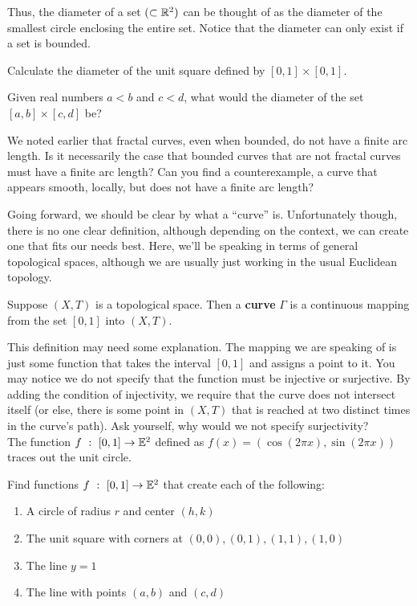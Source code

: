 Thus, the diameter of a set $(\subset \mathbb{R}^2)$ can be thought of as the diameter of the smallest circle enclosing the entire set. Notice that the diameter can only exist if a set is bounded. 
\begin{exercise}
    Calculate the diameter of the unit square defined by $[0,1]\times[0,1]$.
\end{exercise}
\begin{exercise}
    Given real numbers $a<b$ and $c<d$, what would the diameter of the set $[a,b]\times [c,d]$ be?
\end{exercise}
\begin{exercise} 
    We noted earlier that fractal curves, even when bounded, do not have a finite arc length. Is it necessarily the case that bounded curves that are not fractal curves must have a finite arc length? Can you find a counterexample, a curve that appears smooth, locally, but does not have a finite arc length? 
\end{exercise}

Going forward, we should be clear by what a ``curve'' is. Unfortunately though, there is no one clear definition, although depending on the context, we can create one that fits our needs best. Here, we'll be speaking in terms of general topological spaces, although we are usually just working in the usual Euclidean topology. \\

\begin{definition}[Curve]
    Suppose $(X,T)$ is a topological space. Then a \textbf{curve} $\Gamma$ is a continuous mapping from the set $[0,1]$ into $(X,T)$.
\end{definition}

This definition may need some explanation. The mapping we are speaking of is just some function that takes the interval $[0,1]$ and assigns a point to it. You may notice we do not specify that the function must be injective or surjective. By adding the condition of injectivity, we require that the curve does not intersect itself (or else, there is some point in $(X,T)$ that is reached at two distinct times in the curve's path). Ask yourself, why would we not specify surjectivity?\\

The function $f\ :\ [0,1]\to\mathbb{E}^2$ defined as $f(x)=\left(\cos(2\pi x),\sin(2\pi x)\right)$ traces out the unit circle.\\

\begin{exercise}
    Find functions $f\ :\ [0,1]\to\mathbb{E}^2$ that create each of the following:
    \begin{enumerate}
        \item A circle of radius $r$ and center $(h,k)$
        \item The unit square with corners at $(0,0),(0,1),(1,1),(1,0)$
        \item The line $y=1$
        \item The line with points $(a,b)$ and $(c,d)$
    \end{enumerate}
\end{exercise}

